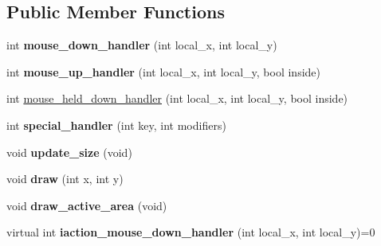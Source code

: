 \subsection*{Public Member Functions}
\begin{DoxyCompactItemize}
\item 
\hypertarget{classGLUI__Mouse__Interaction_ae21d31df518cdd5c6542d8cc88681a57}{int {\bfseries mouse\-\_\-down\-\_\-handler} (int local\-\_\-x, int local\-\_\-y)}\label{classGLUI__Mouse__Interaction_ae21d31df518cdd5c6542d8cc88681a57}

\item 
\hypertarget{classGLUI__Mouse__Interaction_a03d3c78048418b27f8bbe258f6f455e2}{int {\bfseries mouse\-\_\-up\-\_\-handler} (int local\-\_\-x, int local\-\_\-y, bool inside)}\label{classGLUI__Mouse__Interaction_a03d3c78048418b27f8bbe258f6f455e2}

\item 
int \hyperlink{classGLUI__Mouse__Interaction_a91bf2ba2ff20dab94ef634e38fbfaa84}{mouse\-\_\-held\-\_\-down\-\_\-handler} (int local\-\_\-x, int local\-\_\-y, bool inside)
\item 
\hypertarget{classGLUI__Mouse__Interaction_aadcfba66761f87037341c7031e225746}{int {\bfseries special\-\_\-handler} (int key, int modifiers)}\label{classGLUI__Mouse__Interaction_aadcfba66761f87037341c7031e225746}

\item 
\hypertarget{classGLUI__Mouse__Interaction_a29237239a861d24ab52b971b0d2fead2}{void {\bfseries update\-\_\-size} (void)}\label{classGLUI__Mouse__Interaction_a29237239a861d24ab52b971b0d2fead2}

\item 
\hypertarget{classGLUI__Mouse__Interaction_ab51243d0750f3cc8f950e046c4bffd13}{void {\bfseries draw} (int x, int y)}\label{classGLUI__Mouse__Interaction_ab51243d0750f3cc8f950e046c4bffd13}

\item 
\hypertarget{classGLUI__Mouse__Interaction_aacb2dd881015d1f7e8eeced3796e3a6d}{void {\bfseries draw\-\_\-active\-\_\-area} (void)}\label{classGLUI__Mouse__Interaction_aacb2dd881015d1f7e8eeced3796e3a6d}

\item 
\hypertarget{classGLUI__Mouse__Interaction_ab4168e2ccfdb1a8afe2b220e53902b8d}{virtual int {\bfseries iaction\-\_\-mouse\-\_\-down\-\_\-handler} (int local\-\_\-x, int local\-\_\-y)=0}\label{classGLUI__Mouse__Interaction_ab4168e2ccfdb1a8afe2b220e53902b8d}


\end{DoxyCompactItemize}
